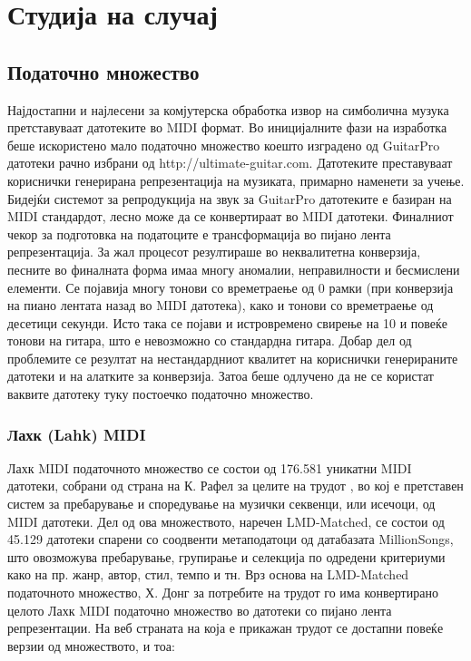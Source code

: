 \chapter{Студија на случај}
\label{ch:studija}

\section{Податочно множество}

Најдостапни и најлесени за комјутерска обработка извор на симболична музука претставуваат датотеките во MIDI формат. Во иницијалните фази на изработка беше искористено мало податочно множество коешто изградено од GuitarPro датотеки рачно избрани од http://ultimate-guitar.com. Датотеките преставуваат кориснички генерирана репрезентација на музиката, примарно наменети за учење. Бидејќи системот за репродукција на звук за GuitarPro датотеките е базиран на MIDI стандардот, лесно може да се конвертираат во MIDI датотеки. Финалниот чекор за подготовка на податоците е трансформација во пијано лента репрезентација. За жал процесот резултираше во неквалитетна конверзија, песните во финалната форма имаа многу аномалии, неправилности и бесмислени елементи. Се појавија многу тонови со времетраење од 0 рамки (при конверзија на пиано лентата назад во MIDI датотека), како и тонови со времетраење од десетици секунди. Исто така се појави и истровремено свирење на 10 и повеќе тонови на гитара, што е невозможно со стандардна гитара. Добар дел од проблемите се резултат на нестандардниот квалитет на кориснички генерираните датотеки и на алатките за конверзија. Затоа беше одлучено да не се користат ваквите датотеку туку постоечко податочно множество.

\subsection{Лахк (Lahk) MIDI}

Лахк MIDI податочното множество се состои од 176.581 уникатни MIDI датотеки, собрани од страна на К. Рафел за целите на трудот \cite{Raffel2016}, во кој е претставен систем за пребарување и споредување на музички секвенци, или исечоци, од MIDI датотеки. Дел од ова множеството, наречен LMD-Matched, се состои од 45.129 датотеки спарени со соодвенти метаподатоци од датабазата MillionSongs, што овозможува пребарување, групирање и селекција по одредени критериуми како на пр. жанр, автор, стил, темпо и тн. 
Врз основа на LMD-Matched податочното множество, Х. Донг за потребите на трудот \cite{Dong2017} го има конвертирано целото Лахк MIDI податочно множество во датотеки со пијано лента репрезентации. На веб страната на која е прикажан трудот се достапни повеќе верзии од множеството, и тоа:

